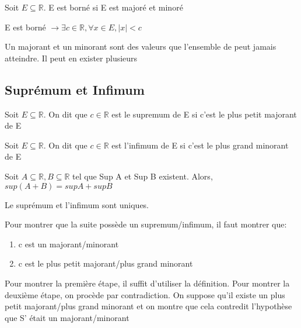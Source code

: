 \documentclass{article}
\begin{document}
\begin{definition}
    Soit $E \subseteq \mathbb{R}$. E est borné si E est majoré et minoré
\end{definition}

\begin{proposition}
    E est borné $ \to \exists c \in \mathbb{R}, \forall x \in E, |x|<c $
\end{proposition}

\begin{remark}
    Un majorant et un minorant sont des valeurs que l'ensemble de peut jamais
    atteindre. Il peut en exister plusieurs
\end{remark}

\subsection{Suprémum et Infimum}

\begin{definition}[Supremum]
    Soit $E \subseteq \mathbb{R}$. On dit que $c \in \mathbb{R}$ est le supremum
    de E si c'est le plus petit majorant de E
\end{definition}

\begin{definition}[Infimum]
    Soit $E \subseteq \mathbb{R}$. On dit que $c \in \mathbb{R}$ est l'infimum
    de E si c'est le plus grand minorant de E
\end{definition}

\begin{proposition}
    Soit $ A \subseteq \mathbb{R}, B \subseteq \mathbb{R}$ tel que Sup A et Sup B
    existent. Alors, $sup(A+B)= sup A + sup B$
\end{proposition}

\begin{proposition}
    Le suprémum et l'infimum sont uniques.
\end{proposition}

\begin{problem}
    Pour montrer que la suite possède un supremum/infimum, il faut montrer que:
    \begin{enumerate}
	\item c est un majorant/minorant
	\item c est le plus petit majorant/plus grand minorant
    \end{enumerate}

    Pour montrer la première étape, il suffit d'utiliser la définition. Pour
    montrer la deuxième étape, on procède par contradiction. On suppose qu'il
    existe un plus petit majorant/plus grand minorant et on montre que cela
    contredit l'hypothèse que S' était un majorant/minorant

\end{problem}
\end{document}
